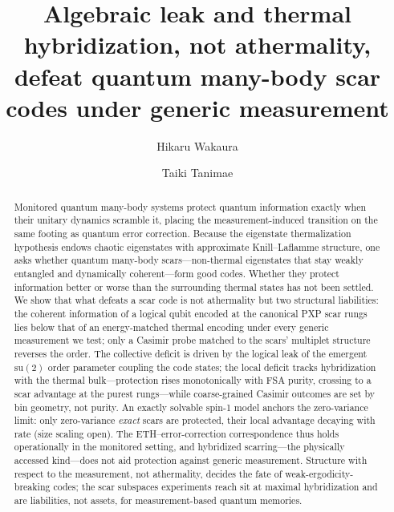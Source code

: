 \documentclass[aps,prb,twocolumn]{revtex4-2}
\begin{document}
\title{Algebraic leak and thermal hybridization, not athermality, defeat
quantum many-body scar codes under generic measurement}

\author{Hikaru Wakaura}
\author{Taiki Tanimae}

\begin{abstract}
Monitored quantum many-body systems protect quantum information exactly when
their unitary dynamics scramble it, placing the
measurement-induced transition on the same footing as quantum error correction.
Because the eigenstate thermalization hypothesis endows chaotic eigenstates with
approximate Knill--Laflamme structure, one asks whether quantum
many-body scars---non-thermal eigenstates that stay weakly entangled and
dynamically coherent---form good codes.
Whether they protect information better or worse than the surrounding thermal
states has not been settled.
We show that what defeats a scar code is not athermality but two
structural liabilities: the coherent information of a logical qubit encoded
at the canonical PXP scar rungs lies below that of an energy-matched thermal
encoding under every generic measurement we test; only a Casimir probe
matched to the scars' multiplet structure reverses the order.
The collective deficit is driven by the logical leak of the emergent
$\mathrm{su}(2)$ order parameter coupling the code states; the local
deficit tracks hybridization with the thermal bulk---protection
rises monotonically with FSA purity, crossing to a scar
advantage at the purest rungs---while coarse-grained Casimir outcomes are
set by bin geometry, not purity.
An exactly solvable spin-1 model anchors the zero-variance limit: only
zero-variance \emph{exact} scars are protected, their
local advantage decaying with rate (size scaling open). The ETH--error-correction correspondence thus holds
operationally in the monitored setting, and hybridized scarring---the
physically accessed kind---does not aid protection against generic
measurement.
Structure with respect to the measurement, not athermality, decides the
fate of weak-ergodicity-breaking codes; the scar subspaces
experiments reach sit at maximal hybridization and are liabilities, not
assets, for measurement-based quantum memories.
\end{abstract}
\end{document}
